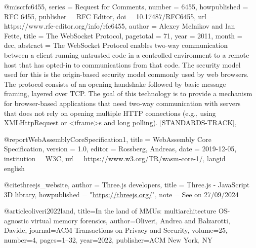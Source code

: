 @misc{rfc6455,
    series =    {Request for Comments},
    number =    6455,
    howpublished =  {RFC 6455},
    publisher = {RFC Editor},
    doi =       {10.17487/RFC6455},
    url =       {https://www.rfc-editor.org/info/rfc6455},
    author =    {Alexey Melnikov and Ian Fette},
    title =     {{The WebSocket Protocol}},
    pagetotal = 71,
    year =      2011,
    month =     dec,
    abstract =  {The WebSocket Protocol enables two-way communication between a client running untrusted code in a controlled environment to a remote host that has opted-in to communications from that code. The security model used for this is the origin-based security model commonly used by web browsers. The protocol consists of an opening handshake followed by basic message framing, layered over TCP. The goal of this technology is to provide a mechanism for browser-based applications that need two-way communication with servers that does not rely on opening multiple HTTP connections (e.g., using XMLHttpRequest or \textless{}iframe\textgreater{}s and long polling). {[}STANDARDS-TRACK{]}},
}

@report{WebAssemblyCoreSpecification1,
  title = {{WebAssembly Core Specification}},
  version = {1.0},
  editor = {Rossberg, Andreas},
  date = {2019-12-05},
  institution = {{W3C}},
  url = {https://www.w3.org/TR/wasm-core-1/},
  langid = {english}
}

@cite{threejs_website,
    author = {Three.js developers},
    title = {Three.js - JavaScript 3D library},
    howpublished = "\url{https://threejs.org/}",
    note = {See on 27/09/2024}
}

@article{oliveri2022land,
  title={In the land of MMUs: multiarchitecture OS-agnostic virtual memory forensics},
  author={Oliveri, Andrea and Balzarotti, Davide},
  journal={ACM Transactions on Privacy and Security},
  volume={25},
  number={4},
  pages={1--32},
  year={2022},
  publisher={ACM New York, NY}
}
